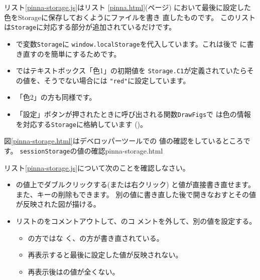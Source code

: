 リスト\ref{pinna-storage.js}はリスト
\ref{pinna.html}(\pageref{pinna.html}ページ)
において最後に設定した色をStorageに保存しておくように\JS ファイルを書き
直したものです。
このリストは\texttt{Storage}に対応する部分が追加されているだけです。
\begin{itemize}
 \item {}で変数\texttt{Storage}に
       \texttt{window.localStorage}を代入しています。これは後で
       に書き直すのを簡単にするためです。
 \item {}ではテキストボックス「色1」の初期値を
       \texttt{Storage.C1}が定義されていたらその値を、そうでない場合には
       \texttt{"red"}に設定しています。
 \item 「色2」の方も同様です。
 \item 「設定」ボタンが押されたときに呼び出される関数\texttt{DrawFigs}で
       は色の情報を対応する\texttt{Storage}に格納しています
       ()。
\end{itemize}
図\ref{pinna-storage.html}はデベロッパーツールでの
値の確認をしているところです。
{\protect\texttt{sessionStorage}の値の確認}{pinna-storage.html}
\begin{Problem}\upshape
 リスト\ref{pinna-storage.js}について次のことを確認しなさい。
 \begin{itemize}
  \item {}の値上でダブルクリックする(または右クリック)
        と値が直接書き直せます。また、キーの削除もできます。
        別の値に書き直した後で開きなおすとその値
        が反映された図が描ける。
  \item リストのをコメントアウトして、のコ
        メントを外して、別の値を設定する。
        \begin{itemize}
         \item {}の方ではな
        く、の方が書き直されている。
         \item 再表示すると最後に設定した値が反映されない。
         \item 再表示後はの値が全くない。
        \end{itemize}
 \end{itemize}
\end{Problem}


